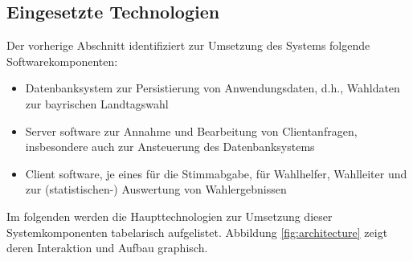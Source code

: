 \documentclass[a4paper,12pt]{article}
\begin{document}
\subsection{Eingesetzte Technologien}
Der vorherige Abschnitt identifiziert zur Umsetzung des Systems folgende Softwarekomponenten:
\begin{itemize}
      \item Datenbanksystem zur Persistierung von Anwendungsdaten, d.h., Wahldaten zur bayrischen Landtagswahl
      \item Server software zur Annahme und Bearbeitung von Clientanfragen, insbesondere auch zur Ansteuerung des Datenbanksystems
      \item Client software, je eines für die Stimmabgabe, für Wahlhelfer, Wahlleiter und zur (statistischen-) Auswertung von Wahlergebnissen 
\end{itemize}
Im folgenden werden die Haupttechnologien zur Umsetzung dieser Systemkomponenten tabelarisch aufgelistet. Abbildung \ref{fig:architecture} zeigt
deren Interaktion und Aufbau graphisch.
\end{document}
